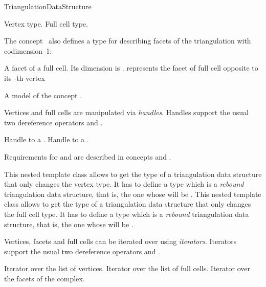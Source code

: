 \begin{ccRefConcept}{TriangulationDataStructure}
\ccTypes
{}


{
Vertex type.
}
\ccGlue
{}
{
Full cell type.
}

The concept \ccRefName\ also defines a type for describing facets of the
triangulation with codimension~1:

{A facet of a full cell. Its dimension is
.  represents the facet of
full cell  opposite to its -th vertex}

{A model of the concept .}

Vertices and full cells are manipulated via \emph{handles}. Handles support the
usual two dereference operators  and .

{
Handle to a .
}
\ccGlue
{}
{
Handle to a .
}


Requirements for  and  are described in concepts
 and
 .

\begin{ccAdvanced}
{This nested template class allows to get the type of a triangulation
data structure that only changes the vertex type.  It has to define a type
 which is a {\it rebound} triangulation data structure, that is, the
one whose  will be .}
\ccGlue
{}
{This nested template class allows to get the type of a triangulation
data structure that only changes the full cell type.  It has to define a type
 which is a {\it rebound} triangulation data structure, that is, the
one whose  will be .}
\end{ccAdvanced}


Vertices, facets and full cells can be iterated over using \emph{iterators}.
Iterators support the usual two dereference operators  and
.

{
Iterator over the list of vertices.
}
\ccGlue
{}
{
Iterator over the list of full cells.
}
\ccGlue
{}
{
Iterator over the facets of the complex.
}


\end{ccRefConcept}

